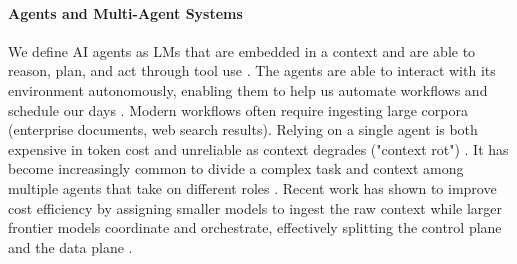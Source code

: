 \documentclass{article} %
\begin{document}
\paragraph{Agents and Multi-Agent Systems} 
We define AI agents as LMs that are embedded in a context and are able to reason, plan, and act through tool use \citep{belcak2025small, su2025toolorchestra, wang2025empirical, yao2022react}. The agents are able to interact with its environment autonomously, enabling them to help us automate workflows and schedule our days \citep{pan2025measuring}.  
Modern workflows often require ingesting large corpora (enterprise documents, web search results). Relying on a single agent is both expensive in token cost and unreliable as context degrades ("context rot") \citep{hong2025context, zhang2024chain}.
It has become increasingly common to divide a complex task and context among multiple agents that take on different roles \citep{chen2023agentverse,dang2025multi,hadfield2025multiagent,shen2023hugginggptsolvingaitasks}. 
Recent work has shown to improve cost efficiency by assigning smaller models to ingest the raw context while larger frontier models coordinate and orchestrate, effectively splitting the control plane and the data plane \citep{narayan2025minions}.
\end{document}
